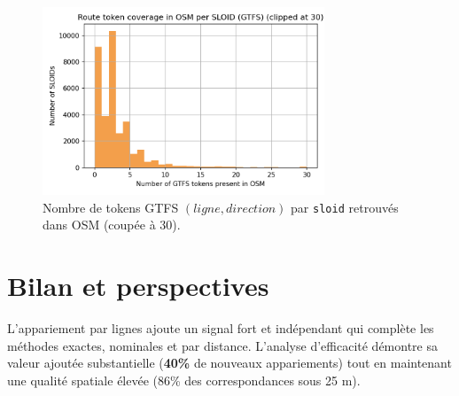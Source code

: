 \begin{figure}[H]
  \centering
  \includegraphics[width=0.75\textwidth]{../figures/chap4/hist_route_token_coverage_per_sloid.png}
  \caption{Nombre de tokens GTFS \((ligne, direction)\) par \texttt{sloid} retrouvés dans OSM (coupée à 30).}
\end{figure}


\section{Bilan et perspectives}

L'appariement par lignes ajoute un signal fort et indépendant qui complète les méthodes exactes, nominales et par distance. L'analyse d'efficacité démontre sa valeur ajoutée substantielle (\textbf{40\%} de nouveaux appariements) tout en maintenant une qualité spatiale élevée (86\% des correspondances sous 25 m).
